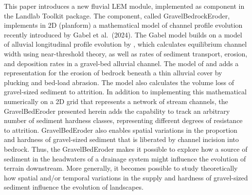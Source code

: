 \documentclass[journal abbreviation, manuscript]{copernicus}
\begin{document}
This paper introduces a new fluvial LEM module, implemented as component in the Landlab Toolkit package. The component, called GravelBedrockEroder, implements in 2D (planform) a mathematical model of channel profile evolution recently introduced by Gabel et al.~(2024). The Gabel model builds on a model of alluvial longitudinal profile evolution by \citet{wickert}, which calculates  equilibrium channel width using near-threshold theory, as well as rates of sediment transport,  erosion, and deposition rates in a gravel-bed alluvial channel. The model of \citet{gabel2024mathematical} and adds a representation for the erosion of bedrock beneath a thin alluvial cover by plucking and bed-load abrasion. The model also calculates the volume loss of gravel-sized sediment to attrition. In addition to implementing this mathematical numerically on a 2D grid that represents a network of stream channels, the GravelBedEroder presented herein adds the capability to track an arbitrary number of sediment hardness classes, representing different degrees of resistance to attrition. GravelBedEroder also enables spatial variations in the proportion and hardness of gravel-sized sediment that is liberated by channel incision into bedrock. Thus, the GravelBedEroder makes it possible to explore how a source of sediment in the headwaters of a drainage system might influence the evolution of terrain downstream. More generally, it becomes possible to study theoretically how spatial and/or temporal variations in the supply and hardness of gravel-sized sediment influence the evolution of landscapes.




\end{document}
